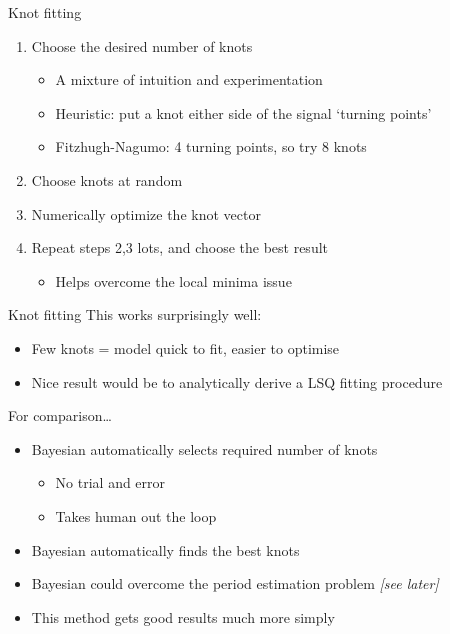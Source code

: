 \documentclass[presentation]{beamer}
\begin{document}
\begin{frame}[label={sec:orgd75b9ba}]{Knot fitting}
\begin{enumerate}[<+->]
\item Choose the desired number of knots
\begin{itemize}
\item A mixture of intuition and experimentation
\item Heuristic: put a knot either side of the signal `turning points'
\item Fitzhugh-Nagumo: 4 turning points, so try 8 knots
\end{itemize}
\item Choose knots at random
\item Numerically optimize the knot vector
\item Repeat steps 2,3 lots, and choose the best result
\begin{itemize}
\item Helps overcome the local minima issue
\end{itemize}
\end{enumerate}
\end{frame}

\begin{frame}[label={sec:orgf49375c}]{Knot fitting}
This works surprisingly well:
\begin{itemize}
\item Few knots = model quick to fit, easier to optimise
\item Nice result would be to analytically derive a LSQ fitting procedure
\end{itemize}
\vfill
For comparison\ldots{}
\begin{itemize}[<+->]
\item Bayesian automatically selects required number of knots
\begin{itemize}
\item No trial and error
\item Takes human out the loop
\end{itemize}
\item Bayesian automatically finds the best knots
\item Bayesian could overcome the period estimation problem \emph{[see later]}
\item This method gets good results much more simply
\end{itemize}
\end{frame}
\end{document}
